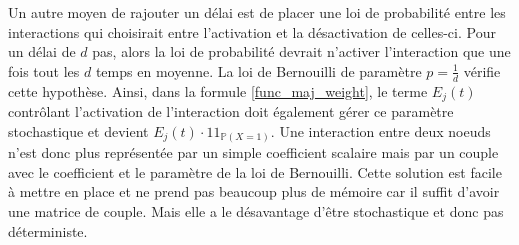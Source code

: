 \documentclass[11pt, a4paper]{article}
\begin{document}
Un autre moyen de rajouter un délai est de placer une loi de probabilité entre
les interactions qui choisirait entre l'activation et la désactivation de
celles-ci. Pour un délai de $d$ pas, alors la loi de probabilité devrait
n'activer l'interaction que une fois tout les $d$ temps en moyenne. La loi de
Bernouilli de paramètre $p = \frac{1}{d}$ vérifie cette hypothèse. Ainsi, dans
la formule \ref{func_maj_weight}, le terme $E_j(t)$ contrôlant l'activation de
l'interaction doit également gérer ce paramètre stochastique et devient
$E_j(t)\cdot 1\!\!1_{\mathbb{P}(X = 1)}$. Une interaction entre deux noeuds
n'est donc plus représentée par un simple coefficient scalaire mais par un
couple avec le coefficient et le paramètre de la loi de Bernouilli. Cette
solution est facile à mettre en place et ne prend pas beaucoup plus de mémoire
car il suffit d'avoir une matrice de couple. Mais elle a le désavantage d'être
stochastique et donc pas déterministe.
\end{document}
